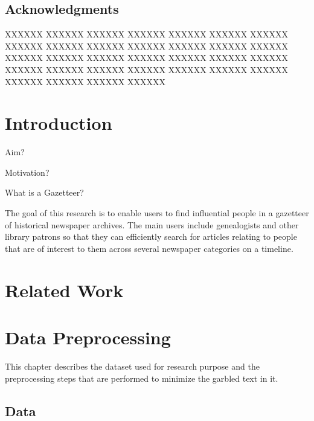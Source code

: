 \documentclass[letterpaper,11pt]{report}
\begin{document}
\newpage
\pagestyle{empty}


\newpage



\section*{Acknowledgments}\label{section:acknowledgments}
\pagestyle{plain}

XXXXXX XXXXXX XXXXXX XXXXXX XXXXXX XXXXXX XXXXXX XXXXXX XXXXXX XXXXXX XXXXXX XXXXXX XXXXXX XXXXXX XXXXXX XXXXXX XXXXXX XXXXXX XXXXXX XXXXXX XXXXXX XXXXXX XXXXXX XXXXXX XXXXXX XXXXXX XXXXXX XXXXXX XXXXXX XXXXXX XXXXXX XXXXXX 

\newpage

\tableofcontents
\listoffigures 
\listoftables

\newpage

\newpage

\newpage
\mbox{}



\chapter{Introduction}\label{chapter:introduction}
\setcounter{page}{1}
\onehalfspacing

Aim?

Motivation? 

What is a Gazetteer?

The goal of this research is to enable users to find influential people in a gazetteer of historical newspaper archives. The main users  include genealogists and other library patrons so that  they can efficiently search for articles relating to people that are of interest to them across several newspaper categories on a timeline.


\chapter{Related Work}
\chapter{Data Preprocessing}\label{chapter:data preprocessing} 

 
This chapter describes the dataset used for research purpose and the preprocessing steps that are performed to minimize the garbled text in it.
 
\section{Data}
\end{document}

